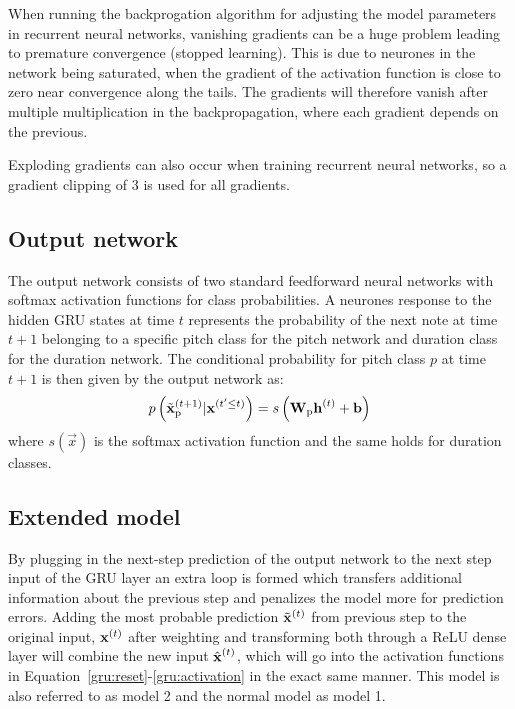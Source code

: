 	When running the backprogation algorithm for adjusting the model parameters in recurrent neural networks, vanishing gradients can be a huge problem leading to premature convergence (stopped learning). This is due to neurones in the network being saturated, when the gradient of the activation function is close to zero near convergence along the tails. The gradients will therefore vanish after multiple multiplication in the backpropagation, where each gradient depends on the previous. 

	Exploding gradients can also occur when training recurrent neural networks, so a gradient clipping of 3 is used for all gradients.  

\subsection{Output network} %
\label{sub:output_network}
	The output network consists of two standard feedforward neural networks with softmax activation functions for class probabilities. A neurones response to the hidden GRU states at time $t$ represents the probability of the next note at time $t+1$ belonging to a specific pitch class for the pitch network and duration class for the duration network.
	The conditional probability for pitch class $p$ at time $t+1$ is then given by the output network as:
	\begin{equation}
		p\left(\tilde{\vec{x}}\order{t+1}\idx{p}|\vec{x}\order{t'\le t}\right) = s\left(\mat{W}\idx{p} \vec{h}\order{t} + \vec{b}\right)%
	\end{equation}
	where $s(\vec{x})$ is the softmax activation function and the same holds for duration classes. 

	
	\subsection{Extended model} %
	\label{sub:extended_model}
		By plugging in the next-step prediction of the output network to the next step input of the GRU layer an extra loop is formed which transfers additional information about the previous step and penalizes the model more for prediction errors.  
		Adding the most probable prediction $\tilde{\bm{\mathrm{x}}}^{(t)}$ from previous step to the original input, $\bm{\mathrm{x}}^{(t)}$ after weighting and transforming both through a ReLU dense layer will combine the new input $\hat{\vec{x}}\order{t}$, which will go into the activation functions in Equation~\eqref{gru:reset}-\eqref{gru:activation} in the exact same manner. This model is also referred to as model 2 and the normal model as model 1. 

